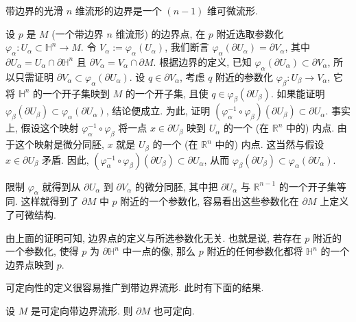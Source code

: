 \begin{RiemannProposition}\label{prop:smooth-boundary-manifold}
带边界的光滑 $n$ 维流形的边界是一个 $(n-1)$ 维可微流形.
\end{RiemannProposition}

\begin{RiemannProof}
设 $p$ 是 $M$ (一个带边界 $n$ 维流形) 的边界点, 在 $p$ 附近选取参数化 $\varphi_\alpha:U_\alpha\subset\mathbb{H}^n\to M$. 令 $V_\alpha:=\varphi_\alpha(U_\alpha)$, 我们断言 $\varphi_\alpha(\partial U_\alpha)=\partial V_\alpha$, 其中 $\partial U_\alpha=U_\alpha\cap\partial\mathbb{H}^n$ 且 $\partial V_\alpha=V_\alpha\cap\partial M$. 根据边界的定义, 已知 $\varphi_\alpha(\partial U_\alpha)\subset\partial V_\alpha$, 所以只需证明 $\partial V_\alpha\subset\varphi_\alpha(\partial U_\alpha)$. 设 $q\in\partial V_\alpha$, 考虑 $q$ 附近的参数化 $\varphi_\beta:U_\beta\to V_\alpha$, 它将 $\mathbb{H}^n$ 的一个开子集映到 $M$ 的一个开子集, 且使 $q\in\varphi_\beta(\partial U_\beta)$. 如果能证明 $\varphi_\beta(\partial U_\beta)\subset\varphi_\alpha(\partial U_\alpha)$, 结论便成立. 为此, 证明 $(\varphi_\alpha^{-1}\circ\varphi_\beta)(\partial U_\beta)\subset\partial U_\alpha$. 事实上, 假设这个映射 $\varphi_\alpha^{-1}\circ\varphi_\beta$ 将一点 $x\in\partial U_\beta$ 映到 $U_\alpha$ 的一个 (在 $\mathbb{R}^n$ 中的) 内点. 由于这个映射是微分同胚, $x$ 就是 $U_\beta$ 的一个 (在 $\mathbb{R}^n$ 中的) 内点. 这当然与假设 $x\in\partial U_\beta$ 矛盾. 因此, $(\varphi_\alpha^{-1}\circ\varphi_\beta)(\partial U_\beta)\subset\partial U_\alpha$, 从而 $\varphi_\beta(\partial U_\beta)\subset\varphi_\alpha(\partial U_\alpha)$.

限制 $\varphi_\alpha$ 就得到从 $\partial U_\alpha$ 到 $\partial V_\alpha$ 的微分同胚, 其中把 $\partial U_\alpha$ 与 $\mathbb{R}^{n-1}$ 的一个开子集等同. 这样就得到了 $\partial M$ 中 $p$ 附近的一个参数化, 容易看出这些参数化在 $\partial M$ 上定义了可微结构.
\end{RiemannProof}

\begin{RiemannRemark}\label{rem:boundary-point-independent-of-chart}
由上面的证明可知, 边界点的定义与所选参数化无关. 也就是说, 若存在 $p$ 附近的一个参数化, 使得 $p$ 为 $\partial\mathbb{H}^n$ 中一点的像, 那么 $p$ 附近的任何参数化都将 $\mathbb{H}^n$ 的一个边界点映到 $p$.
\end{RiemannRemark}

可定向性的定义很容易推广到带边界流形. 此时有下面的结果.

\begin{RiemannProposition}\label{prop:orientability-of-boundary}
设 $M$ 是可定向带边界流形. 则 $\partial M$ 也可定向.
\end{RiemannProposition}

